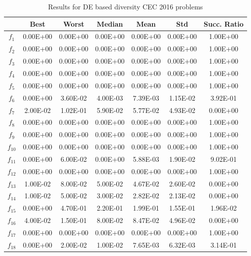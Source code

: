 \begin{table}[t]
\begin{scriptsize}
\centering
\caption{Results for DE based diversity CEC 2016 problems}
\label{tab:Results_CEC2016}
\begin{tabular}{|c|c|c|c|c|c|c|}
\hline
 & \textbf{Best} & \textbf{Worst} & \textbf{Median} & \textbf{Mean} & \textbf{Std} & \textbf{Succ. Ratio} \\ \hline
$f_1$ & 0.00E+00 & 0.00E+00 & 0.00E+00 & 0.00E+00 & 0.00E+00 & 1.00E+00 \\ \hline
$f_2$ & 0.00E+00 & 0.00E+00 & 0.00E+00 & 0.00E+00 & 0.00E+00 & 1.00E+00 \\ \hline
$f_3$ & 0.00E+00 & 0.00E+00 & 0.00E+00 & 0.00E+00 & 0.00E+00 & 1.00E+00 \\ \hline
$f_4$ & 0.00E+00 & 0.00E+00 & 0.00E+00 & 0.00E+00 & 0.00E+00 & 1.00E+00 \\ \hline
$f_5$ & 0.00E+00 & 0.00E+00 & 0.00E+00 & 0.00E+00 & 0.00E+00 & 1.00E+00 \\ \hline
$f_6$ & 0.00E+00 & 3.60E-02 & 4.00E-03 & 7.39E-03 & 1.15E-02 & 3.92E-01 \\ \hline
$f_7$ & 2.00E-02 & 1.02E-01 & 5.90E-02 & 5.77E-02 & 4.93E-02 & 0.00E+00 \\ \hline
$f_8$ & 0.00E+00 & 0.00E+00 & 0.00E+00 & 0.00E+00 & 0.00E+00 & 1.00E+00 \\ \hline
$f_9$ & 0.00E+00 & 0.00E+00 & 0.00E+00 & 0.00E+00 & 0.00E+00 & 1.00E+00 \\ \hline
$f_{10}$ & 0.00E+00 & 0.00E+00 & 0.00E+00 & 0.00E+00 & 0.00E+00 & 1.00E+00 \\ \hline
$f_{11}$ & 0.00E+00 & 6.00E-02 & 0.00E+00 & 5.88E-03 & 1.90E-02 & 9.02E-01 \\ \hline
$f_{12}$ & 0.00E+00 & 0.00E+00 & 0.00E+00 & 0.00E+00 & 0.00E+00 & 1.00E+00 \\ \hline
$f_{13}$ & 1.00E-02 & 8.00E-02 & 5.00E-02 & 4.67E-02 & 2.60E-02 & 0.00E+00 \\ \hline
$f_{14}$ & 1.00E-02 & 5.00E-02 & 3.00E-02 & 2.82E-02 & 2.13E-02 & 0.00E+00 \\ \hline
$f_{15}$ & 0.00E+00 & 4.70E-01 & 2.20E-01 & 1.99E-01 & 1.55E-01 & 1.96E-02 \\ \hline
$f_{16}$ & 4.00E-02 & 1.50E-01 & 8.00E-02 & 8.47E-02 & 4.96E-02 & 0.00E+00 \\ \hline
$f_{17}$ & 0.00E+00 & 0.00E+00 & 0.00E+00 & 0.00E+00 & 0.00E+00 & 1.00E+00 \\ \hline
$f_{18}$ & 0.00E+00 & 2.00E-02 & 1.00E-02 & 7.65E-03 & 6.32E-03 & 3.14E-01 \\ \hline

\end{tabular}
\end{scriptsize}
\end{table}
